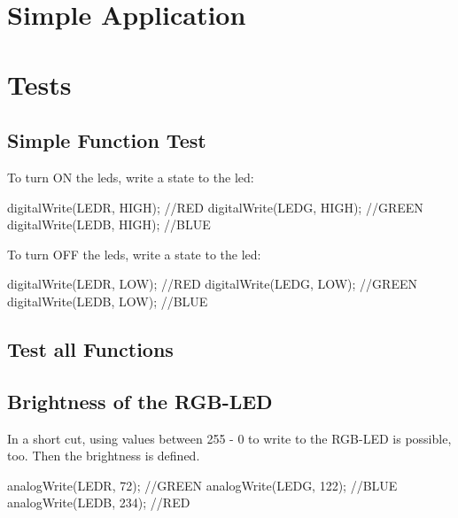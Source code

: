 \section{Simple Application}

\section{Tests}

\subsection{Simple Function Test}


To turn ON the \ac{led}s, write a state  to the \ac{led}:



\medskip

{
    \begin{Arduino}
        digitalWrite(LEDR, HIGH); //RED
        digitalWrite(LEDG, HIGH); //GREEN
        digitalWrite(LEDB, HIGH); //BLUE
    \end{Arduino}
}

\medskip

To turn OFF the \ac{led}s, write a state  to the \ac{led}:

\medskip

{
    \begin{Arduino}
        digitalWrite(LEDR, LOW); //RED
        digitalWrite(LEDG, LOW); //GREEN
        digitalWrite(LEDB, LOW); //BLUE
    \end{Arduino}
}

\bigskip


\subsection{Test all Functions}


\subsection{Brightness of the RGB-LED}

In a short cut, using values between 255 - 0 to write to the RGB-LED is possible, too. Then the brightness is defined.

\medskip

{
    \begin{Arduino}
        analogWrite(LEDR, 72);  //GREEN 
        analogWrite(LEDG, 122); //BLUE 
        analogWrite(LEDB, 234); //RED
    \end{Arduino}
}


